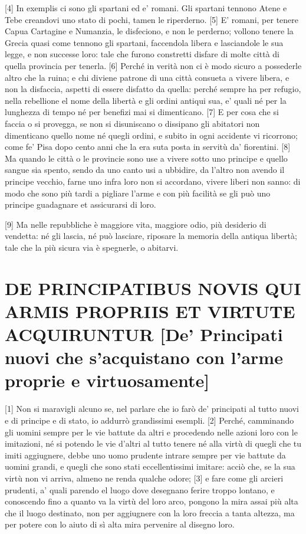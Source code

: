 {[}4{]} In exemplis ci sono gli spartani ed e' romani. Gli spartani
tennono Atene e Tebe creandovi uno stato di pochi, tamen le riperderno.
{[}5{]} E' romani, per tenere Capua Cartagine e Numanzia, le disfeciono,
e non le perderno; vollono tenere la Grecia quasi come tennono gli
spartani, faccendola libera e lasciandole le sua legge, e non successe
loro: tale che furono constretti disfare di molte città di quella
provincia per tenerla. {[}6{]} Perché in verità non ci è modo sicuro a
possederle altro che la ruina; e chi diviene patrone di una città
consueta a vivere libera, e non la disfaccia, aspetti di essere disfatto
da quella: perché sempre ha per refugio, nella rebellione el nome della
libertà e gli ordini antiqui sua, e' quali né per la lunghezza di tempo
né per benefizi mai si dimenticano. {[}7{]} E per cosa che si faccia o
si provegga, se non si disuniscano o dissipano gli abitatori non
dimenticano quello nome né quegli ordini, e subito in ogni accidente vi
ricorrono; come fe' Pisa dopo cento anni che la era suta posta in
servitù da' fiorentini. {[}8{]} Ma quando le città o le provincie sono
use a vivere sotto uno principe e quello sangue sia spento, sendo da uno
canto usi a ubbidire, da l'altro non avendo il principe vecchio, farne
uno infra loro non si accordano, vivere liberi non sanno: di modo che
sono più tardi a pigliare l'arme e con più facilità se gli può uno
principe guadagnare et assicurarsi di loro.

{[}9{]} Ma nelle repubbliche è maggiore vita, maggiore odio, più
desiderio di vendetta: né gli lascia, né può lasciare, riposare la
memoria della antiqua libertà; tale che la più sicura via è spegnerle, o
abitarvi.

\quebra\section{DE PRINCIPATIBUS NOVIS QUI ARMIS PROPRIIS ET VIRTUTE ACQUIRUNTUR\break
{[}De' Principati nuovi che s'acquistano con l'arme proprie e virtuosamente{]}}

{[}1{]} Non si maravigli alcuno se, nel parlare che io farò de'
principati al tutto nuovi e di principe e di stato, io addurrò
grandissimi esempli. {[}2{]} Perché, camminando gli uomini sempre per le
vie battute da altri e procedendo nelle azioni loro con le imitazioni,
né si potendo le vie d'altri al tutto tenere né alla virtù di quegli che
tu imiti aggiugnere, debbe uno uomo prudente intrare sempre per vie
battute da uomini grandi, e quegli che sono stati eccellentissimi
imitare: acciò che, se la sua virtù non vi arriva, almeno ne renda
qualche odore; {[}3{]} e fare come gli arcieri prudenti, a' quali
parendo el luogo dove desegnano ferire troppo lontano, e conoscendo fino
a quanto va la virtù del loro arco, pongono la mira assai più alta che
il luogo destinato, non per aggiugnere con la loro freccia a tanta
altezza, ma per potere con lo aiuto di sì alta mira pervenire al disegno
loro.

